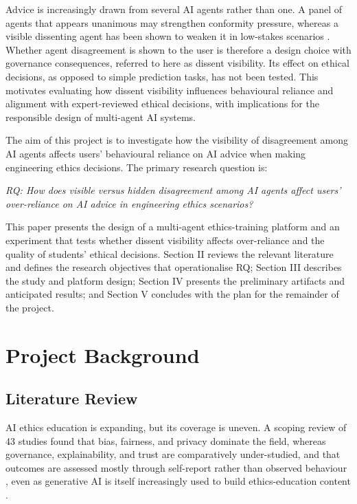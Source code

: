 \documentclass[conference]{IEEEtran}
\begin{document}
Advice is increasingly drawn from several AI agents rather than one. A panel of agents that appears unanimous may strengthen conformity pressure, whereas a visible dissenting agent has been shown to weaken it in low-stakes scenarios \cite{tsuchiya2026multiaiadvice}. Whether agent disagreement is shown to the user is therefore a design choice with governance consequences, referred to here as dissent visibility. Its effect on ethical decisions, as opposed to simple prediction tasks, has not been tested. This motivates evaluating how dissent visibility influences behavioural reliance and alignment with expert-reviewed ethical decisions, with implications for the responsible design of multi-agent AI systems.

The aim of this project is to investigate how the visibility of disagreement among AI agents affects users' behavioural reliance on AI advice when making engineering ethics decisions. The primary research question is:

\textit{RQ: How does visible versus hidden disagreement among AI agents affect users' over-reliance on AI advice in engineering ethics scenarios?}

This paper presents the design of a multi-agent ethics-training platform and an experiment that tests whether dissent visibility affects over-reliance and the quality of students' ethical decisions. Section II reviews the relevant literature and defines the research objectives that operationalise RQ; Section III describes the study and platform design; Section IV presents the preliminary artifacts and anticipated results; and Section V concludes with the plan for the remainder of the project.
\section{Project Background}

\subsection{Literature Review}
AI ethics education is expanding, but its coverage is uneven. A scoping review of 43 studies found that bias, fairness, and privacy dominate the field, whereas governance, explainability, and trust are comparatively under-studied, and that outcomes are assessed mostly through self-report rather than observed behaviour \cite{hillis2026aiethics}, even as generative AI is itself increasingly used to build ethics-education content \cite{grey2025ethicalreasoning}.
\end{document}
